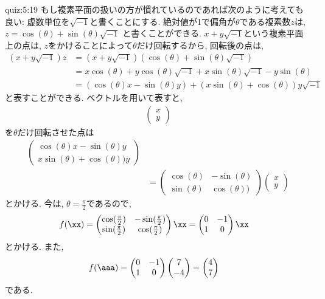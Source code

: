 \begin{answerof}{quiz:5:19}
  もし複素平面の扱いの方が慣れているのであれば次のように考えても良い:
  虚数単位を$\sqrt{-1}$と書くことにする.
  絶対値が1で偏角が$\theta$である複素数$z$は,
  $z=\cos(\theta)+\sin(\theta)\sqrt{-1}$
  と書くことができる.
  $x+y\sqrt{-1}$という複素平面上の点は,
  $z$をかけることによって$\theta$だけ回転するから,
  回転後の点は,
  \begin{align*}
    (x+y\sqrt{-1})z&=(x+y\sqrt{-1})(\cos(\theta)+\sin(\theta)\sqrt{-1})\\
    &=x\cos(\theta)+y\cos(\theta)\sqrt{-1}+x\sin(\theta)\sqrt{-1}-y\sin(\theta)\\
    &=(\cos(\theta)x-\sin(\theta)y)+(x\sin(\theta)+\cos(\theta))y\sqrt{-1}
  \end{align*}
  と表すことができる.
  ベクトルを用いて表すと,
  \begin{align*}
    \begin{pmatrix}x\\y\end{pmatrix}
  \end{align*}
  を$\theta$だけ回転させた点は
  \begin{align*}
      \begin{pmatrix}
        \cos(\theta)x-\sin(\theta)y\\x\sin(\theta)+\cos(\theta))y
      \end{pmatrix}\\
      &=
      \begin{pmatrix}
        \cos(\theta)&-\sin(\theta)\\\sin(\theta)&\cos(\theta))
      \end{pmatrix}
      \begin{pmatrix}x\\y\end{pmatrix}
  \end{align*}
  とかける.
  今は, $\theta=\frac{\pi}{2}$であるので,
  \begin{align*}
    f(\xx)&=
    \begin{pmatrix}
      \cos(\frac{\pi}{2})&-\sin(\frac{\pi}{2})\\
      \sin(\frac{\pi}{2})&\cos(\frac{\pi}{2})
    \end{pmatrix}
    \xx=
    \begin{pmatrix}
      0&-1\\
      1&0
    \end{pmatrix}
    \xx
  \end{align*}
  とかける.  また,
  \begin{align*}
    f(\aaa)&=
    \begin{pmatrix}
      0&-1\\
      1&0
    \end{pmatrix}
    \begin{pmatrix}
      7\\
      -4
    \end{pmatrix}
    =
    \begin{pmatrix}
      4\\7
    \end{pmatrix}
  \end{align*}
  である.
  
\end{answerof}


